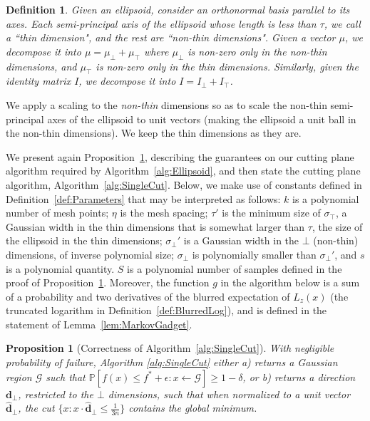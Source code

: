\documentclass[11pt,letter]{article}
\renewcommand{\Pr}{\mathbb{P}}
\newcommand{\from}{\leftarrow}
\renewcommand{\vec}[1]{\mathbf{#1}}
\newcommand{\ferr}{\epsilon}
\newcommand{\perr}{\delta}
\newcommand{\safety}{s}
\newcounter{nTheorems}
\numberwithin{nTheorems}{section}
\newtheorem{proposition}[nTheorems]{Proposition}
\newtheorem{definition}[nTheorems]{Definition}
\begin{document}
\begin{definition}
\label{def:TopBottom}
  Given an ellipsoid, consider an orthonormal basis parallel to its axes. Each semi-principal axis of the ellipsoid whose length is less than $\tau$, we call a ``thin dimension", and the rest are ``non-thin dimensions".
  Given a vector $\mu$, we decompose it into $\mu = \mu_\bot + \mu_\top$ where $\mu_\bot$ is non-zero only in the non-thin dimensions, and $\mu_\top$ is non-zero only in the thin dimensions.
Similarly, given the identity matrix $I$, we decompose it into $I = I_\bot + I_\top$.
\end{definition}
We apply a scaling to the \emph{non-thin} dimensions so as to scale the non-thin semi-principal axes of the ellipsoid to unit vectors (making the ellipsoid a unit ball in the non-thin dimensions).
We keep the thin dimensions as they are.


We present again Proposition~\ref{prop:Alg1Correctness}, describing the guarantees on our cutting plane algorithm required by Algorithm~\ref{alg:Ellipsoid}, and then state the cutting plane algorithm, Algorithm~\ref{alg:SingleCut}.
Below, we make use of constants defined in Definition~\ref{def:Parameters}  that may be interpreted as follows: $k$ is a polynomial number of mesh points;  $\eta$ is the mesh spacing; $\tau'$ is the minimum size of $\sigma_{\top}$, a Gaussian width in the thin dimensions that is somewhat larger than $\tau$, the size of the ellipsoid in the thin dimensions; $\sigma_\bot'$ is a Gaussian width in the $\bot$ (non-thin) dimensions, of inverse polynomial size; $\sigma_\bot$ is polynomially smaller than $\sigma_\bot'$, and $\safety$ is a polynomial quantity. $S$ is a polynomial number of samples defined in the proof of Proposition~\ref{prop:Alg1Correctness}.
Moreover, the function $g$ in the algorithm below is a sum of a probability and two derivatives of the blurred expectation of $L_z(x)$ (the truncated logarithm in Definition~\ref{def:BlurredLog}), and is defined in the statement of Lemma~\ref{lem:MarkovGadget}.


\begin{proposition}[Correctness of Algorithm~\ref{alg:SingleCut}]
\label{prop:Alg1Correctness}
With negligible probability of failure, Algorithm \ref{alg:SingleCut} either a) returns a Gaussian region $\mathcal{G}$ such that $\Pr[f(x) \le f^\ast+\ferr : x \from \mathcal{G}] \ge 1 - \perr$, or b) returns a direction $\vec{d}_\bot$, restricted to the $\bot$ dimensions, such that when normalized to a unit vector $\hat{\vec{d}}_\bot$, the cut $\{x:x\cdot \hat{\vec{d}}_\bot\leq \frac{1}{3n}\}$ contains the global minimum.
\end{proposition}
\end{document}
